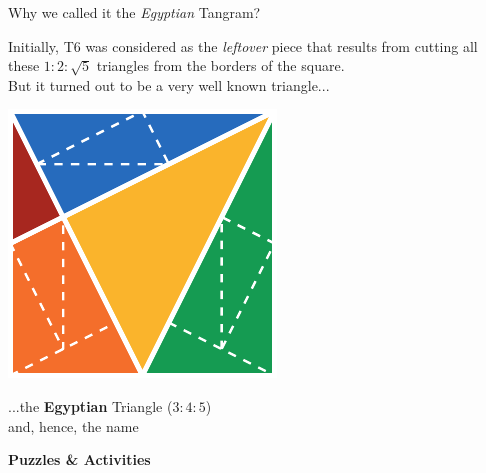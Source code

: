 \documentclass[14pt]{beamer}
\begin{document}

    \begin{frame}{Why we called it the \emph{Egyptian} Tangram?}
        \begin{center}
            {\small Initially, T6 was considered as the \emph{leftover} piece that results from cutting all these $1\!\!:\!\!2\!\!:\!\!\sqrt{5}$ triangles from the borders of the square.\\But it turned out to be a very well known triangle...}

            \bigskip \bigskip

            \includegraphics[height=15ex]{figures/figure003a.pdf} \\

            \bigskip \bigskip

            ...the \textbf{Egyptian} Triangle ($3\!\!:\!\!4\!\!:\!\!5$)\\{\small and, hence, the name}
        \end{center}
    \end{frame}


    \begin{frame}{}
        \begin{center}
            \textbf{\Huge Puzzles \& Activities}\\
        \end{center}
    \end{frame}

\end{document}

